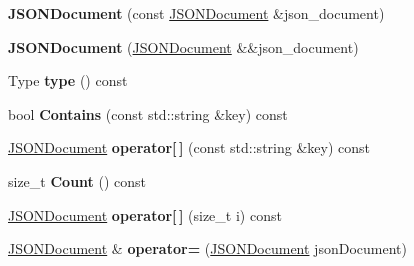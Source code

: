 \begin{DoxyCompactItemize}
\item 
{\bfseries J\+S\+O\+N\+Document} (const \hyperlink{classrocksdb_1_1JSONDocument}{J\+S\+O\+N\+Document} \&json\+\_\+document)\hypertarget{classrocksdb_1_1JSONDocument_ac054de19e7260a00f7bb7f83daf502a2}{}\label{classrocksdb_1_1JSONDocument_ac054de19e7260a00f7bb7f83daf502a2}

\item 
{\bfseries J\+S\+O\+N\+Document} (\hyperlink{classrocksdb_1_1JSONDocument}{J\+S\+O\+N\+Document} \&\&json\+\_\+document)\hypertarget{classrocksdb_1_1JSONDocument_ad3b691c15e9e66547c1d6598b72fbe5a}{}\label{classrocksdb_1_1JSONDocument_ad3b691c15e9e66547c1d6598b72fbe5a}

\item 
Type {\bfseries type} () const\hypertarget{classrocksdb_1_1JSONDocument_ae24738c5b23619b63ae7e9c923629ca9}{}\label{classrocksdb_1_1JSONDocument_ae24738c5b23619b63ae7e9c923629ca9}

\item 
bool {\bfseries Contains} (const std\+::string \&key) const\hypertarget{classrocksdb_1_1JSONDocument_a7ca62d131a53c40c87a354dc61d3e2f2}{}\label{classrocksdb_1_1JSONDocument_a7ca62d131a53c40c87a354dc61d3e2f2}

\item 
\hyperlink{classrocksdb_1_1JSONDocument}{J\+S\+O\+N\+Document} {\bfseries operator\mbox{[}$\,$\mbox{]}} (const std\+::string \&key) const\hypertarget{classrocksdb_1_1JSONDocument_a515dc269b2fc74c5baf0619f946d18b0}{}\label{classrocksdb_1_1JSONDocument_a515dc269b2fc74c5baf0619f946d18b0}

\item 
size\+\_\+t {\bfseries Count} () const\hypertarget{classrocksdb_1_1JSONDocument_a2e66abdc3d34d0816428c69b05de8a5d}{}\label{classrocksdb_1_1JSONDocument_a2e66abdc3d34d0816428c69b05de8a5d}

\item 
\hyperlink{classrocksdb_1_1JSONDocument}{J\+S\+O\+N\+Document} {\bfseries operator\mbox{[}$\,$\mbox{]}} (size\+\_\+t i) const\hypertarget{classrocksdb_1_1JSONDocument_a14b3a9783230c00537405a9acd7ff589}{}\label{classrocksdb_1_1JSONDocument_a14b3a9783230c00537405a9acd7ff589}

\item 
\hyperlink{classrocksdb_1_1JSONDocument}{J\+S\+O\+N\+Document} \& {\bfseries operator=} (\hyperlink{classrocksdb_1_1JSONDocument}{J\+S\+O\+N\+Document} json\+Document)\hypertarget{classrocksdb_1_1JSONDocument_a31b25cb70dcf002311e2289a3a7f03a6}{}\label{classrocksdb_1_1JSONDocument_a31b25cb70dcf002311e2289a3a7f03a6}


\end{DoxyCompactItemize}
